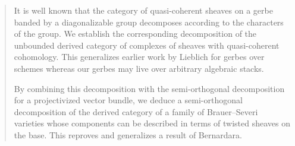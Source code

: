 \begin{abstract}
It is well known that the category of quasi-coherent sheaves on a
gerbe banded by a diagonalizable group decomposes according to
the characters of the group. 
We establish the corresponding decomposition of the unbounded
derived category of complexes of sheaves with quasi-coherent
cohomology. This generalizes earlier work by Lieblich for gerbes
over schemes whereas our gerbes may live over arbitrary algebraic stacks. 

By combining this decomposition with the semi-orthogonal
decomposition for a 
projectivized vector bundle, we deduce a semi-orthogonal
decomposition of the derived category of a family of
Brauer--Severi varieties whose components can be described in terms
of twisted sheaves on the base. This reproves and generalizes a
result of Bernardara.
\end{abstract}

